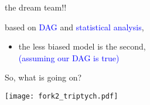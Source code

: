 %
%
\begin{lhframe}[rhgraphic={\texttt{[image: fork2\_reg2.png]}}]
	{the dream team!!}
	
	based on \textcolor{blue}{DAG} and \textcolor{blue}{statistical analysis},
	\begin{itemize}
		\item the less biased model is the second, \\
		{\small \textcolor{blue}{(assuming our DAG is true)} }
	\end{itemize}
\end{lhframe}
%
%
\begin{frame}
	{So, what is going on?}
	
	\begin{figure*}
		\texttt{[image: fork2\_triptych.pdf]}
	\end{figure*}
\end{frame}
%
%
